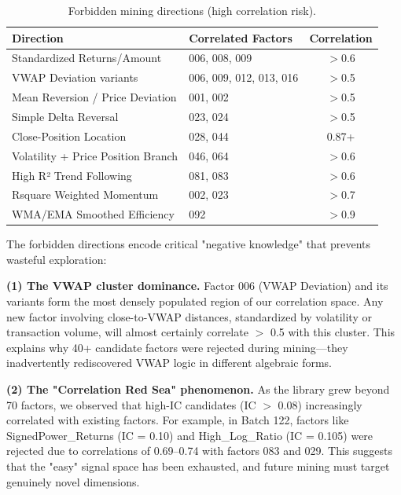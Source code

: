 \documentclass[sigconf]{acmart}
\begin{document}
\begin{table}[h]
  \caption{Forbidden mining directions (high correlation risk).}
  \centering
  \begin{small}
  \begin{tabular}{p{4cm}p{4cm}c}
    \toprule
    Direction & Correlated Factors & Correlation \\
    \midrule
    Standardized Returns/Amount & 006, 008, 009 & $>$0.6 \\
    VWAP Deviation variants & 006, 009, 012, 013, 016 & $>$0.5 \\
    Mean Reversion / Price Deviation & 001, 002 & $>$0.5 \\
    Simple Delta Reversal & 023, 024 & $>$0.5 \\
    Close-Position Location & 028, 044 & 0.87+ \\
    Volatility + Price Position Branch & 046, 064 & $>$0.6 \\
    High R² Trend Following & 081, 083 & $>$0.6 \\
    Rsquare Weighted Momentum & 002, 023 & $>$0.7 \\
    WMA/EMA Smoothed Efficiency & 092 & $>$0.9 \\
    \bottomrule
  \end{tabular}
  \end{small}
\end{table}

The forbidden directions encode critical "negative knowledge" that prevents wasteful exploration:

\textbf{(1) The VWAP cluster dominance.}
Factor 006 (VWAP Deviation) and its variants form the most densely populated region of our correlation space.
Any new factor involving close-to-VWAP distances, standardized by volatility or transaction volume, will almost certainly correlate $>$ 0.5 with this cluster.
This explains why 40+ candidate factors were rejected during mining---they inadvertently rediscovered VWAP logic in different algebraic forms.

\textbf{(2) The "Correlation Red Sea" phenomenon.}
As the library grew beyond 70 factors, we observed that high-IC candidates (IC $>$ 0.08) increasingly correlated with existing factors.
For example, in Batch 122, factors like SignedPower\_Returns (IC = 0.10) and High\_Log\_Ratio (IC = 0.105) were rejected due to correlations of 0.69--0.74 with factors 083 and 029.
This suggests that the "easy" signal space has been exhausted, and future mining must target genuinely novel dimensions.
\end{document}
